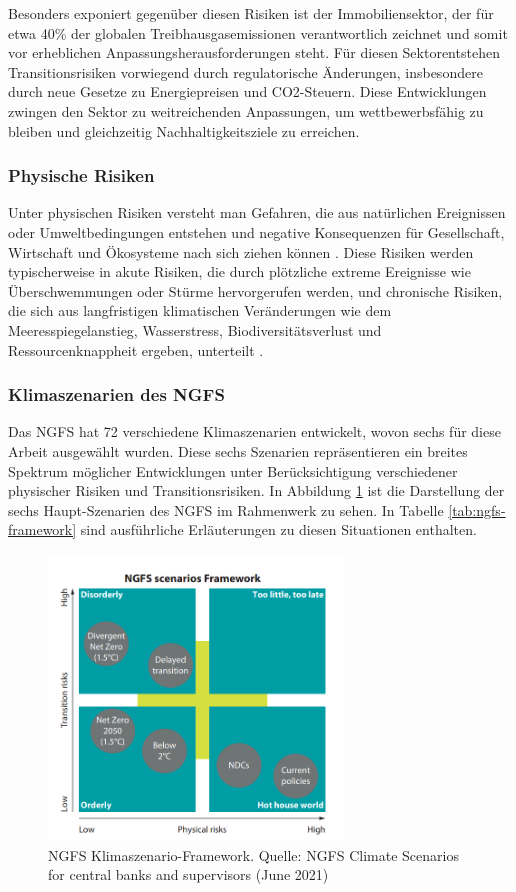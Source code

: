 Besonders exponiert gegenüber diesen Risiken ist der Immobiliensektor, der für etwa 40\% der globalen Treibhausgasemissionen verantwortlich zeichnet \parencite{unepfi2023realestate} und somit vor erheblichen Anpassungsherausforderungen steht.
Für diesen Sektorentstehen Transitionsrisiken vorwiegend durch regulatorische Änderungen, insbesondere durch neue Gesetze zu Energiepreisen und CO2-Steuern. Diese Entwicklungen zwingen den Sektor zu weitreichenden Anpassungen, um wettbewerbsfähig zu bleiben und gleichzeitig Nachhaltigkeitsziele zu erreichen.
\subsubsection{Physische Risiken}
Unter physischen Risiken versteht man Gefahren, die aus natürlichen Ereignissen oder Umweltbedingungen entstehen und negative Konsequenzen für Gesellschaft, Wirtschaft und Ökosysteme nach sich ziehen können \parencite{greenvisionsolutions_transitorische_2024}. Diese Risiken werden typischerweise in akute Risiken, die durch plötzliche extreme Ereignisse wie Überschwemmungen oder Stürme hervorgerufen werden, und chronische Risiken, die sich aus langfristigen klimatischen Veränderungen wie dem Meeresspiegelanstieg, Wasserstress, Biodiversitätsverlust und Ressourcenknappheit ergeben, unterteilt \parencite{dnb2019values}.

\subsubsection{Klimaszenarien des NGFS}
Das \ac{NGFS} hat 72 verschiedene Klimaszenarien entwickelt, wovon sechs für diese Arbeit ausgewählt wurden. Diese sechs Szenarien repräsentieren ein breites Spektrum möglicher Entwicklungen unter Berücksichtigung verschiedener physischer Risiken und Transitionsrisiken. In Abbildung \ref{fig:ngfs} ist die Darstellung der sechs Haupt-Szenarien des NGFS im Rahmenwerk zu sehen. In Tabelle \ref{tab:ngfs-framework} sind ausführliche Erläuterungen zu diesen Situationen enthalten.

\begin{figure}[htbp]
    \centering
    \includegraphics[width=0.7\textwidth]{figures/NGFS.png}
    \caption{NGFS Klimaszenario-Framework. Quelle: NGFS Climate Scenarios for central banks and supervisors (June 2021)}
    \label{fig:ngfs}
\end{figure}
\FloatBarrier

